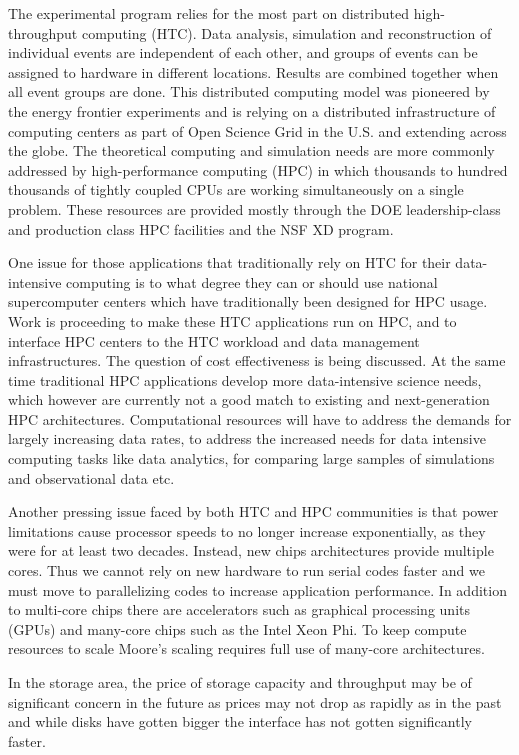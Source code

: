 The experimental program relies for the most part on distributed high-throughput computing (HTC).  Data analysis, simulation and reconstruction of individual events are independent of each other, and groups of events can be assigned to hardware in different locations. Results are combined together when all event groups are done.  This distributed computing model was pioneered by the energy frontier experiments and is relying on a distributed infrastructure of computing centers as part of Open Science Grid in the U.S. and extending across the globe. The theoretical computing and simulation needs are more commonly addressed by high-performance computing (HPC) in which thousands to hundred thousands of tightly coupled CPUs are working simultaneously on a single problem. These resources are provided mostly through the DOE leadership-class and production class HPC facilities and the NSF XD program. 

One issue for those applications that traditionally rely on HTC for their data-intensive computing is to what degree they can or should use national supercomputer centers which have traditionally been designed for HPC usage. Work is proceeding to make these HTC applications run on HPC, and to interface HPC centers to the HTC workload and data management infrastructures. The question of cost effectiveness is being discussed.  At the same time traditional HPC applications develop more data-intensive science needs, which however are currently not a good match to existing and next-generation HPC architectures.  Computational resources will have to address the demands for largely increasing data rates, to address the increased needs for data intensive computing tasks like data analytics, for comparing large samples of simulations and observational data etc. 

Another pressing issue faced by both HTC and HPC communities is that power limitations cause processor speeds to no longer increase exponentially, as they were for at least two decades.  Instead, new chips architectures provide multiple cores. Thus we cannot rely on new hardware to run serial codes faster and we must move to parallelizing codes to increase application performance. In addition to multi-core chips there are accelerators such as graphical processing units (GPUs) and many-core chips such as the Intel Xeon Phi. To keep compute resources to scale Moore’s scaling requires full use of many-core architectures. 

In the storage area, the price of storage capacity and throughput may be of significant concern in the future as prices may not drop as rapidly as in the past and while disks have gotten bigger the interface has not gotten significantly faster.

